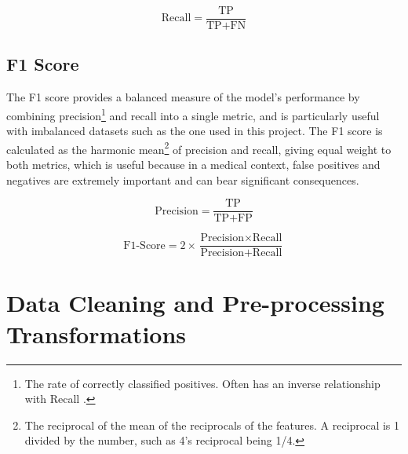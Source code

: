 \documentclass[12pt]{report}
\begin{document}
\begin{equation}\label{eq:Recall}
    \text{Recall} = \frac{\text{TP}}{\text{TP} + \text{FN}}
\end{equation}

\subsection{F1 Score}
The F1 score provides a balanced measure of the model's performance by combining precision\footnote{The rate of correctly classified positives. Often has an inverse relationship with Recall \autocite{google_classification_nodate}.}
and recall into a single metric, and is particularly useful with imbalanced datasets such as the one used in this project.
The F1 score is calculated as the harmonic mean\footnote{The reciprocal of the mean of the reciprocals of the features. A reciprocal is 1 divided by the number, such as 4's reciprocal being 1/4.}
of precision and recall, giving equal weight to both metrics, which is useful because in a medical context, false positives and negatives are extremely important 
and can bear significant consequences.

\begin{equation}\label{eq:Precision}
    \text{Precision} = \frac{\text{TP}}{\text{TP} + \text{FP}}
\end{equation}

\begin{equation}\label{eq:F1Score}
    \text{F1-Score} = 2 \times \frac{\text{Precision} \times \text{Recall}}{\text{Precision} + \text{Recall}}
\end{equation}



\section{Data Cleaning and Pre-processing Transformations}\label{sec:Preprocessing}
\end{document}
